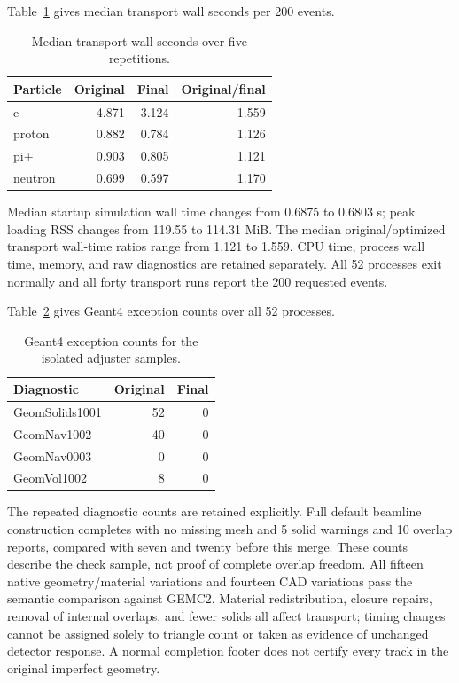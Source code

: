 Table~\ref{tab:adjuster-timing} gives median transport wall seconds per 200 events.

\begin{table}[htbp]
\centering
\caption{Median transport wall seconds over five repetitions.}
\label{tab:adjuster-timing}
\begin{tabular}{lrrr}
\toprule
Particle & Original & Final & Original/final \\
\midrule
e- & 4.871 & 3.124 & 1.559 \\
proton & 0.882 & 0.784 & 1.126 \\
pi+ & 0.903 & 0.805 & 1.121 \\
neutron & 0.699 & 0.597 & 1.170 \\
\bottomrule
\end{tabular}
\end{table}

Median startup simulation wall time changes from 0.6875 to 0.6803 s; peak loading RSS changes from 119.55 to
114.31 MiB. The median original/optimized transport wall-time ratios range from 1.121 to 1.559. CPU time,
process wall time, memory, and raw diagnostics are retained separately. All 52 processes exit normally and
all forty transport runs report the 200 requested events.

Table~\ref{tab:adjuster-warnings} gives Geant4 exception counts over all 52 processes.

\begin{table}[htbp]
\centering
\caption{Geant4 exception counts for the isolated adjuster samples.}
\label{tab:adjuster-warnings}
\begin{tabular}{lrr}
\toprule
Diagnostic & Original & Final \\
\midrule
GeomSolids1001 & 52 & 0 \\
GeomNav1002 & 40 & 0 \\
GeomNav0003 & 0 & 0 \\
GeomVol1002 & 8 & 0 \\
\bottomrule
\end{tabular}
\end{table}

The repeated diagnostic counts are retained explicitly. Full default beamline construction completes with no
missing mesh and 5 solid warnings and 10 overlap reports, compared with seven and twenty before this merge.
These counts describe the check sample, not proof of complete overlap freedom. All fifteen native
geometry/material variations and fourteen CAD variations pass the semantic comparison against GEMC2.
Material redistribution, closure repairs, removal of internal overlaps, and fewer solids all affect
transport; timing changes cannot be assigned solely to triangle count or taken as evidence of unchanged
detector response. A normal completion footer does not certify every track in the original imperfect
geometry.

